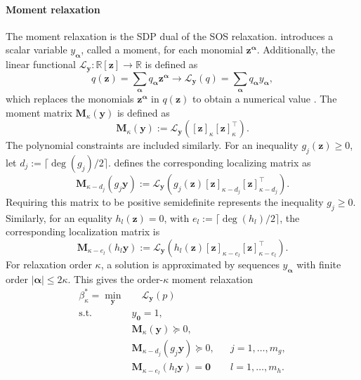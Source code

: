 \paragraph{Moment relaxation}
The moment relaxation is the SDP dual of the SOS relaxation. \cite{Yang2024Semidefinite} 
introduces a scalar variable \(y_{\bm{\alpha}}\), called a moment, for each monomial
\(\bm{z}^{\bm{\alpha}}\). Additionally, the linear functional \(\mathcal{L}_{\bm{y}}:\mathbb{R}[\bm{z}] \to 
\mathbb{R}\) is defined as
\begin{equation}
q(\bm{z})=\sum_{\bm{\alpha}}q_{\bm{\alpha}}\bm{z}^{\bm{\alpha}}
\to 
\mathcal{L}_{\bm{y}}(q) =
\sum_{\bm{\alpha}}q_{\bm{\alpha}}y_{\bm{\alpha}},
\label{eq:riesz_functional_comparison}
\end{equation}
which replaces the monomials $\bm{z}^{\bm{\alpha}}$ in $q(\bm{z})$ to obtain a numerical value \cite{Sangli2025}.
The moment matrix $\bm{M}_{\kappa}(\bm{y})$ is defined as
\begin{equation}
\bm{M}_{\kappa}(\bm{y})
:=
\mathcal{L}_{\bm{y}}
\left(
[\bm{z}]_{\kappa}[\bm{z}]_{\kappa}^{\top}
\right).
\label{eq:moment_matrix_comparison}
\end{equation}
The polynomial constraints are included similarly. For an inequality
\(g_j(\bm{z})\geq0\), let
\(d_j:=\lceil\deg(g_j)/2\rceil\). \cite{Sangli2025} defines the corresponding localizing matrix as
\begin{equation}
\bm{M}_{\kappa-d_j}(g_j\bm{y})
:=
\mathcal{L}_{\bm{y}}
\left(
g_j(\bm{z})
[\bm{z}]_{\kappa-d_j}
[\bm{z}]_{\kappa-d_j}^{\top}
\right).
\label{eq:localizing_matrix_g}
\end{equation}
Requiring this matrix to be positive semidefinite represents the inequality
\(g_j\geq0\). Similarly, for an equality $h_l(\bm{z})=0$, 
with $e_l:=\lceil\deg(h_l)/2\rceil$, the corresponding localization matrix is 
\begin{equation}
\bm{M}_{\kappa-e_l}(h_l\bm{y})
:=
\mathcal{L}_{\bm{y}}
\left(
h_l(\bm{z})
[\bm{z}]_{\kappa-e_l}
[\bm{z}]_{\kappa-e_l}^{\top}
\right).
\label{eq:localizing_matrix_h}
\end{equation}
For relaxation order \(\kappa\), a solution is approximated by 
sequences $y_{\bm{\alpha}}$ with finite order $|\bm{\alpha}| \leq 2 \kappa$.
This gives the order-\(\kappa\) moment
relaxation
\begin{subequations}\label{eq:moment_relaxation_comparison}
\begin{align}
\beta_{\kappa}^{*}
=
\min_{\bm{y}}
&\quad \mathcal{L}_{\bm{y}}(p)
\label{eq:moment_relaxation_objective_comparison}\\
\text{s.t.}\quad
&y_{\bm{0}}=1,
\label{eq:moment_relaxation_normalization_comparison}\\
&\bm{M}_{\kappa}(\bm{y})\succeq0,
\label{eq:moment_relaxation_psd_comparison}\\
&\bm{M}_{\kappa-d_j}(g_j\bm{y})\succeq0,
&&j=1,\ldots,m_g,
\label{eq:moment_relaxation_inequalities_comparison}\\
&\bm{M}_{\kappa-e_l}(h_l\bm{y})=\bm{0}
&&l=1,\ldots,m_h.
\label{eq:moment_relaxation_equalities_comparison}
\end{align}
\end{subequations}
